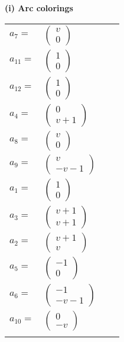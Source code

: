 \documentclass[1p]{elsarticle_modified}
\theoremstyle{definition}
\begin{document}
\flushleft \textbf{(i) Arc colorings}\\
\begin{tabular}{m{7pt} m{180pt} m{7pt} m{180pt} }
\flushright $a_{7}=$&$\begin{pmatrix}v\\0\end{pmatrix}$ \\
\flushright $a_{11}=$&$\begin{pmatrix}1\\0\end{pmatrix}$ \\
\flushright $a_{12}=$&$\begin{pmatrix}1\\0\end{pmatrix}$ \\
\flushright $a_{4}=$&$\begin{pmatrix}0\\v+1\end{pmatrix}$ \\
\flushright $a_{8}=$&$\begin{pmatrix}v\\0\end{pmatrix}$ \\
\flushright $a_{9}=$&$\begin{pmatrix}v\\- v-1\end{pmatrix}$ \\
\flushright $a_{1}=$&$\begin{pmatrix}1\\0\end{pmatrix}$ \\
\flushright $a_{3}=$&$\begin{pmatrix}v+1\\v+1\end{pmatrix}$ \\
\flushright $a_{2}=$&$\begin{pmatrix}v+1\\v\end{pmatrix}$ \\
\flushright $a_{5}=$&$\begin{pmatrix}-1\\0\end{pmatrix}$ \\
\flushright $a_{6}=$&$\begin{pmatrix}-1\\- v-1\end{pmatrix}$ \\
\flushright $a_{10}=$&$\begin{pmatrix}0\\- v\end{pmatrix}$\\&\end{tabular}
\end{document}
